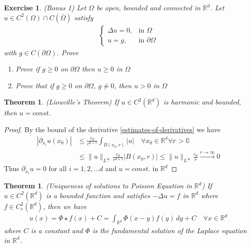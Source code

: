\documentclass{report}
\theoremstyle{tommy}
\newtheorem{thm}[defn]{Theorem}
\newtheorem{ex}[defn]{Exercise}
\begin{document}
\begin{ex} (Bonus 1)
  Let \(\Omega\) be open, bounded and connected in \(\mathbb{R}^d\). Let \(u \in C^2(\Omega) \cap C(\bar \Omega)\) satisfy
  \begin{align*}
    \begin{cases}
      \Delta u = 0, &\text{in } \Omega \\
      u = g, &\text{in } \partial \Omega
    \end{cases}
  \end{align*}
  with \(g \in C(\partial \Omega)\). Prove
  \begin{enumerate}
    \item Prove if \(g \ge 0\) on \(\partial \Omega\) then \(u \ge 0\) in \(\Omega\)
    \item Prove that if \(g \ge 0\) on \(\partial \Omega\), \(g \ne 0\), then \(u > 0\) in \(\Omega\)
  \end{enumerate}
\end{ex}


\begin{thm} (Liouville's Theorem) 
  If \(u \in C^2(\mathbb{R}^d)\) is harmonic and bounded, then \(u = const.\)
\end{thm}

\begin{proof}
  By the bound of the derivative \ref{estimates-of-derivatives} we have
  \begin{align*}
    |\partial_{x_i} u(x_0)| 
    &\le \frac{c_d}{r^{d+1}} \int_{B(x_0, r)} |u| \quad \forall x_0 \in \mathbb{{R}^d \forall r > 0} \\
    &\le \|u\|_{L^\infty} \frac{c_d}{r^{d+1}} |B(x_0, r)| \le \|u\|_{L^\infty} \frac{c_d}{r} \xrightarrow{r \to \infty} 0
  \end{align*}
  Thus \(\partial_{x_i} u = 0\) for all \(i = 1, 2, \dots d\) and \(u = const.\) in \(\mathbb{R}^d\)
\end{proof}

\begin{thm} (Uniqueness of solutions to Poisson Equation in \(\mathbb{R}^d\))
  If \(u \in C^2(\mathbb{R}^d)\) is a bounded function and satisfies \(- \Delta u = f\) in \(\mathbb{R}^d\) where \(f \in C_c^2(\mathbb{R}^d)\), then we have
  \begin{align*}
    u(x) = \Phi \star f(x) + C = \int_{\mathbb{R}^d} \Phi(x-y)f(y) \, dy + C \quad \forall x \in \mathbb{R}^d
  \end{align*}
  where \(C\) is a constant and \(\Phi\) is the fundamental solution of the Laplace equation in \(\mathbb{R}^d\).
\end{thm}
\end{document}
